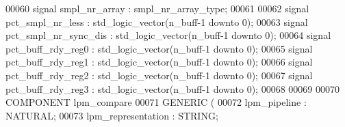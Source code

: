 \begin{DoxyCode}
00060 \textcolor{keywordflow}{signal} \textcolor{vhdlchar}{smpl_nr_array}       \textcolor{vhdlchar}{:} \textcolor{vhdlchar}{smpl_nr_array_type};
00061 
00062 \textcolor{keywordflow}{signal} \textcolor{vhdlchar}{pct_smpl_nr_less}       \textcolor{vhdlchar}{:} \textcolor{comment}{std\_logic\_vector}\textcolor{vhdlchar}{(}\textcolor{vhdlchar}{n_buff}\textcolor{vhdlchar}{-}\textcolor{vhdllogic}{}\textcolor{vhdllogic}{1} \textcolor{keywordflow}{downto} \textcolor{vhdllogic}{}\textcolor{vhdllogic}{0}\textcolor{vhdlchar}{)};
00063 \textcolor{keywordflow}{signal} \textcolor{vhdlchar}{pct_smpl_nr_sync_dis}   \textcolor{vhdlchar}{:} \textcolor{comment}{std\_logic\_vector}\textcolor{vhdlchar}{(}\textcolor{vhdlchar}{n_buff}\textcolor{vhdlchar}{-}\textcolor{vhdllogic}{}\textcolor{vhdllogic}{1} \textcolor{keywordflow}{downto} \textcolor{vhdllogic}{}\textcolor{vhdllogic}{0}\textcolor{vhdlchar}{)};
00064 \textcolor{keywordflow}{signal} \textcolor{vhdlchar}{pct_buff_rdy_reg0}      \textcolor{vhdlchar}{:} \textcolor{comment}{std\_logic\_vector}\textcolor{vhdlchar}{(}\textcolor{vhdlchar}{n_buff}\textcolor{vhdlchar}{-}\textcolor{vhdllogic}{}\textcolor{vhdllogic}{1} \textcolor{keywordflow}{downto} \textcolor{vhdllogic}{}\textcolor{vhdllogic}{0}\textcolor{vhdlchar}{)};
00065 \textcolor{keywordflow}{signal} \textcolor{vhdlchar}{pct_buff_rdy_reg1}      \textcolor{vhdlchar}{:} \textcolor{comment}{std\_logic\_vector}\textcolor{vhdlchar}{(}\textcolor{vhdlchar}{n_buff}\textcolor{vhdlchar}{-}\textcolor{vhdllogic}{}\textcolor{vhdllogic}{1} \textcolor{keywordflow}{downto} \textcolor{vhdllogic}{}\textcolor{vhdllogic}{0}\textcolor{vhdlchar}{)};
00066 \textcolor{keywordflow}{signal} \textcolor{vhdlchar}{pct_buff_rdy_reg2}      \textcolor{vhdlchar}{:} \textcolor{comment}{std\_logic\_vector}\textcolor{vhdlchar}{(}\textcolor{vhdlchar}{n_buff}\textcolor{vhdlchar}{-}\textcolor{vhdllogic}{}\textcolor{vhdllogic}{1} \textcolor{keywordflow}{downto} \textcolor{vhdllogic}{}\textcolor{vhdllogic}{0}\textcolor{vhdlchar}{)};
00067 \textcolor{keywordflow}{signal} \textcolor{vhdlchar}{pct_buff_rdy_reg3}      \textcolor{vhdlchar}{:} \textcolor{comment}{std\_logic\_vector}\textcolor{vhdlchar}{(}\textcolor{vhdlchar}{n_buff}\textcolor{vhdlchar}{-}\textcolor{vhdllogic}{}\textcolor{vhdllogic}{1} \textcolor{keywordflow}{downto} \textcolor{vhdllogic}{}\textcolor{vhdllogic}{0}\textcolor{vhdlchar}{)};
00068 
00069 
00070 \textcolor{keywordflow}{COMPONENT} lpm\_compare
00071     \textcolor{keywordflow}{GENERIC} (
00072         lpm\_pipeline        : \textcolor{comment}{NATURAL};
00073         lpm\_representation      : \textcolor{comment}{STRING};

\end{DoxyCode}

